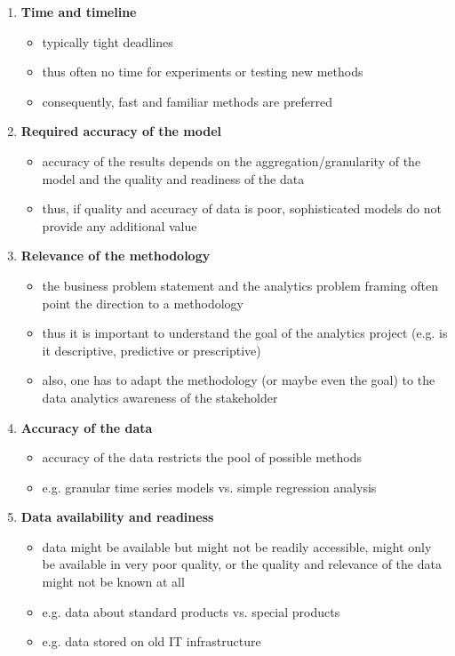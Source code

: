 \documentclass[a4paper, landscape, 6pt, fleqn]{scrartcl}
\renewcommand{\emph}[1]{\textbf{#1}}
\begin{document}
\begin{multicols*}{4}
\begin{enumerate}
\item \emph{Time and timeline}
\begin{itemize}
\item typically tight deadlines
\item thus often no time for experiments or testing new methods
\item consequently, fast and familiar methods are preferred
\end{itemize}
\item \emph{Required accuracy of the model}
\begin{itemize}
\item accuracy of the results depends on the aggregation/granularity of the model and the quality and readiness of the data
\item thus, if quality and accuracy of data is poor, sophisticated models do not provide any additional value
\end{itemize}
\item \emph{Relevance of the methodology}
\begin{itemize}
\item the business problem statement and the analytics problem framing often point the direction to a methodology
\item thus it is important to understand the goal of the analytics project (e.g. is it descriptive, predictive or prescriptive)
\item also, one has to adapt the methodology (or maybe even the goal) to the data analytics awareness of the stakeholder
\end{itemize}
\item \emph{Accuracy of the data}
\begin{itemize}
\item accuracy of the data restricts the pool of possible methods
\item e.g. granular time series models vs. simple regression analysis
\end{itemize}
\item \emph{Data availability and readiness}
\begin{itemize}
\item data might be available but might not be readily accessible, might only be available in very poor quality, or the quality and relevance of the data might not be known at all
\item e.g. data about standard products vs. special products
\item e.g. data stored on old IT infrastructure

\end{itemize}
\end{enumerate}
\end{multicols*}
\end{document}
